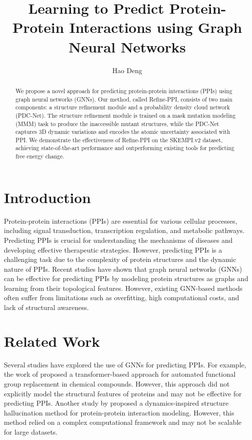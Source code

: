 \documentclass{article}
\begin{document}
        \title{Learning to Predict Protein-Protein Interactions using Graph Neural Networks}
        \author{Hao Deng}
        \maketitle
        \begin{abstract}
        We propose a novel approach for predicting protein-protein interactions (PPIs) using graph neural networks (GNNs). Our method, called Refine-PPI, consists of two main components: a structure refinement module and a probability density cloud network (PDC-Net). The structure refinement module is trained on a mask mutation modeling (MMM) task to produce the inaccessible mutant structures, while the PDC-Net captures 3D dynamic variations and encodes the atomic uncertainty associated with PPI. We demonstrate the effectiveness of Refine-PPI on the SKEMPI.v2 dataset, achieving state-of-the-art performance and outperforming existing tools for predicting free energy change.
        \end{abstract}
        \section{Introduction}
        Protein-protein interactions (PPIs) are essential for various cellular processes, including signal transduction, transcription regulation, and metabolic pathways. Predicting PPIs is crucial for understanding the mechanisms of diseases and developing effective therapeutic strategies. However, predicting PPIs is a challenging task due to the complexity of protein structures and the dynamic nature of PPIs. Recent studies have shown that graph neural networks (GNNs) can be effective for predicting PPIs by modeling protein structures as graphs and learning from their topological features. However, existing GNN-based methods often suffer from limitations such as overfitting, high computational costs, and lack of structural awareness.
        \section{Related Work}
        Several studies have explored the use of GNNs for predicting PPIs. For example, the work of \cite{pan2026transformerbasedapproachautomatedfunctional} proposed a transformer-based approach for automated functional group replacement in chemical compounds. However, this approach did not explicitly model the structural features of proteins and may not be effective for predicting PPIs. Another study by \cite{wu2026dynamicsinspiredstructurehallucinationproteinprotein} proposed a dynamics-inspired structure hallucination method for protein-protein interaction modeling. However, this method relied on a complex computational framework and may not be scalable for large datasets.
\end{document}
